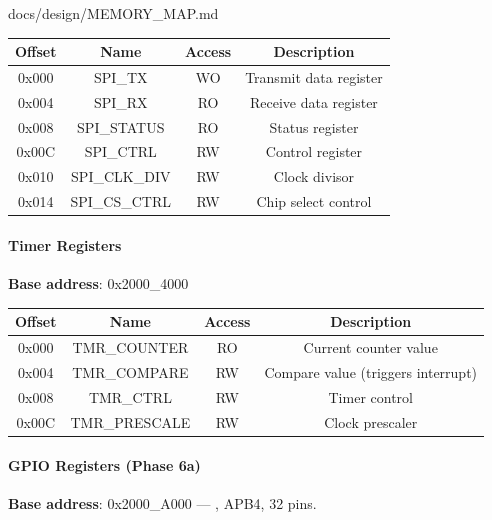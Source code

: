 \begin{relocated}{docs/design/MEMORY_MAP.md}
{
\begin{longtable}[]{@{}cccc@{}}
\toprule\noalign{}
Offset & Name & Access & Description \\
\midrule\noalign{}
\endhead
\bottomrule\noalign{}
\endlastfoot
0x000 & SPI\_TX & WO & Transmit data register \\
0x004 & SPI\_RX & RO & Receive data register \\
0x008 & SPI\_\allowbreak{}STATUS & RO & Status register \\
0x00C & SPI\_CTRL & RW & Control register \\
0x010 & SPI\_\allowbreak{}CLK\_\allowbreak{}DIV & RW & Clock divisor \\
0x014 & SPI\_\allowbreak{}CS\_\allowbreak{}CTRL & RW & Chip select
control \\
\end{longtable}
}

\paragraph{Timer Registers}\label{ds:mm:memory-map:timer-registers}

\textbf{Base address}: 0x2000\_\allowbreak{}4000

{
\begin{longtable}[]{@{}cccc@{}}
\toprule\noalign{}
Offset & Name & Access & Description \\
\midrule\noalign{}
\endhead
\bottomrule\noalign{}
\endlastfoot
0x000 & TMR\_\allowbreak{}COUNTER & RO & Current counter value \\
0x004 & TMR\_\allowbreak{}COMPARE & RW & Compare value (triggers
interrupt) \\
0x008 & TMR\_CTRL & RW & Timer control \\
0x00C & TMR\_\allowbreak{}PRESCALE & RW & Clock prescaler \\
\end{longtable}
}

\paragraph{GPIO Registers (Phase 6a)}\label{ds:mm:memory-map:gpio-registers-phase-6a}

\textbf{Base address}: 0x2000\_\allowbreak{}A000 ---
, APB4, 32 pins.


\end{relocated}
